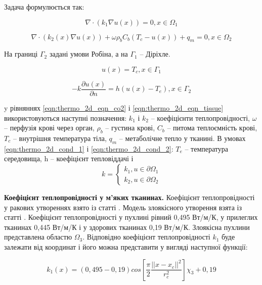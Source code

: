 \noindent Задача формулюється так:

\begin{equation}
    \label{eqn:thermo_2d_eqn_co2}
    \nabla \cdot (k_1 \nabla u(x)) = 0, x \in \Omega_1
\end{equation}

\begin{equation}
    \label{eqn:thermo_2d_eqn_tissue}
    \nabla \cdot (k_2(x) \nabla u(x)) + \omega \rho_b C_b (T_c - u(x)) + q_m  = 0, x \in \Omega_2
\end{equation}

\noindent На границі $\Gamma_2$ задані умови Робіна, а на $\Gamma_1$ -- Діріхле.

\begin{equation}
    \label{eqn:thermo_2d_cond_1}
    u(x) = T_c, x \in \Gamma_1
\end{equation}

\begin{equation}
    \label{eqn:thermo_2d_cond_2}
    -k\dfrac{\partial{u(x)}}{\partial{n}} = h(u(x) - T_e), x \in \Gamma_2
\end{equation}

\noindent y рівняннях \ref{eqn:thermo_2d_eqn_co2} і \ref{eqn:thermo_2d_eqn_tissue} використовуються наступні позначення:
$k_1$ і $k_2$ -- коефіцієнти теплопровідності, $\omega$ -- перфузія крові через орган, $\rho_b$ -- густина крові, $C_b$ 
-- питома теплоємність крові, $T_c$ -- внутрішня температура тіла, $q_m$ -- метаболічне тепло у тканині. В умовах 
\ref{eqn:thermo_2d_cond_1} і \ref{eqn:thermo_2d_cond_2}: $T_e$ -- температура середовища, h -- коефіцієнт тепловіддачі і
$$k=\begin{cases}
k_1, u \in \partial{\Omega_1} \\
k_2, u \in \partial{\Omega_2}
\end{cases}
$$

\textbf{Коефіцієнт теплопровідності у м'яких тканинах.} Коефіцієнт теплопровідності у ракових утвореннях взято із статті 
\cite{lung-tumor-thermal-conductivity}. Модель злоякісного утворення взята із статті \cite{tumor-thermal-model}.
Коефіцієнт теплопровідності у пухлині рівний 0,495 Вт/м/К, у прилеглих тканинах 0,445 Вт/м/К і у здорових тканинах 
0,19 Вт/м/К. Злоякісна пухлини представлена областю $\Omega_3$. Відповідно коефіцієнт теплопровідності $k_1$ буде 
залежати від координат і його можна представити у вигляді наступної функції:

\begin{equation}
    \label{eqn:thermo_2d_thermal_conductivity}
    k_1(x) = (0,495 - 0,19)cos\left[\frac{\pi}{2}\frac{||x-x_c||^2}{r_c^2}\right]\chi_3 + 0,19
\end{equation}

